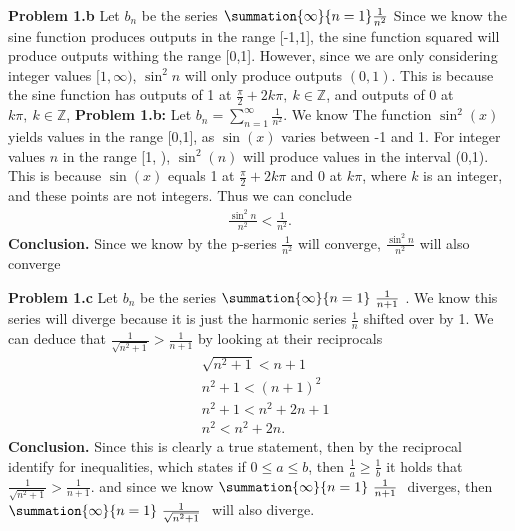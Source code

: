\documentclass{report}
\begin{document}
    \bigbreak \noindent 
    \textbf{Problem 1.b} Let $b_{n}$ be the series $\summation{\infty}{n=1}\frac{1}{n^{2}}$ Since we know the sine function produces outputs in the range [-1,1], the sine function squared will produce outputs withing the range [0,1]. However, since we are only considering integer values $[1,\infty)$, $\sin^2{n}$ will only produce outputs $(0,1)$. This is because the sine function has outputs of 1 at $\frac{\pi}{2}  + 2k\pi,\ k \in \mathbb{Z}$, and outputs of 0 at $k\pi,\ k \in \mathbb{Z}$, 
    \bigbreak \noindent 
    \textbf{Problem 1.b:} Let \( b_n = \sum_{n=1}^{\infty} \frac{1}{n^2} \). We know The function \( \sin^2(x) \) yields values in the range [0,1], as \( \sin(x) \) varies between -1 and 1. For integer values \( n \) in the range [1, \infty), \( \sin^2(n) \) will produce values in the interval (0,1). This is because \( \sin(x) \) equals 1 at \( \frac{\pi}{2} + 2k\pi \) and 0 at \( k\pi \), where \( k \) is an integer, and these points are not integers. Thus we can conclude 
    \begin{align*}
        \frac{\sin^{2}{n}}{n^{2}} < \frac{1}{n^{2}}
    .\end{align*}
    \bigbreak \noindent 
    \textbf{Conclusion.} Since we know by the p-series $\frac{1}{n^{2}}$ will converge, $\frac{\sin^{2}{n}}{n^{2}}$ will also converge

    \pagebreak \bigbreak \noindent 
    \textbf{Problem 1.c} Let  $b_{n}$ be the series $\summation{\infty}{n=1}\ \frac{1}{n+1}\ $. We know this series will diverge because it is just the harmonic series $\frac{1}{n}$ shifted over by 1. We can deduce that $\frac{1}{\sqrt{n^{2} + 1}}  > \frac{1}{n+1}$ by looking at their reciprocals
    \begin{align*}
        &\sqrt{n^{2} + 1} < n+1 \\
        &n^{2} + 1 < (n+1)^{2} \\
        &n^{2}  + 1 < n^{2} + 2n +1 \\
        &n^{2} < n^{2} + 2n
    .\end{align*}
    \bigbreak \noindent 
    \textbf{Conclusion.} Since this is clearly a true statement, then by the reciprocal identify for inequalities, which states if $0 \leq a \leq b $, then $\frac{1}{a} \geq \frac{1}{b}$ it holds that $\frac{1}{\sqrt{n^{2} + 1}} > \frac{1}{n+1}$. and since we know $\summation{\infty}{n=1}\ \frac{1}{n+1} \  $ diverges, then $\summation{\infty}{n=1}\ \frac{1}{\sqrt{n^{2}+1}}\  $ will also diverge.
    
\end{document}
